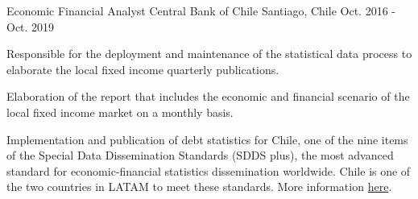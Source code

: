 \begin{cventries}
  \cventry
    {Economic Financial Analyst} %
    {Central Bank of Chile} %
    {Santiago, Chile} %
    {Oct. 2016 - Oct. 2019} %
    {
      \begin{cvitems} %
        \item {Responsible for the deployment and maintenance of the statistical data process to elaborate the local fixed income quarterly publications.}
        \item {Elaboration of the report that includes the economic and financial scenario of the local fixed income market on a monthly basis.}
        \item {Implementation and publication of debt statistics for Chile, one of the nine items of the Special Data Dissemination Standards (SDDS plus), the most advanced standard for economic-financial statistics dissemination worldwide. Chile is one of the two countries in LATAM to meet these standards. More information \href{https://www.bcentral.cl/en/detail-news-and-publications/-/asset_publisher/Exzd7l9NC3Y6/content/id/2228947}{here}.}
      \end{cvitems}
    }

\end{cventries}
